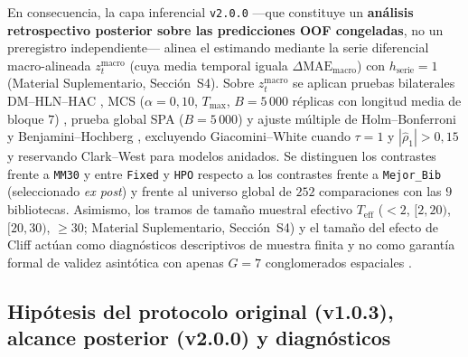 En consecuencia, la capa inferencial \texttt{v2.0.0} ---que constituye un \textbf{análisis retrospectivo posterior sobre las predicciones OOF congeladas}, no un preregistro independiente--- alinea el estimando mediante la serie diferencial macro-alineada $z_t^{\mathrm{macro}}$ (cuya media temporal iguala $\Delta\mathrm{MAE}_{\mathrm{macro}}$) con $h_{\mathrm{serie}}=1$ (Material Suplementario, Sección~S4). Sobre $z_t^{\mathrm{macro}}$ se aplican pruebas bilaterales DM--HLN--HAC \cite{diebold1995,harvey1997,newey1987}, MCS ($\alpha = 0{,}10$, $T_{\max}$, $B=5\,000$ réplicas con longitud media de bloque $7$) \cite{hansen2011mcs,politis1994stationary}, prueba global SPA ($B=5\,000$) \cite{hansen2005spa} y ajuste múltiple de Holm--Bonferroni \cite{holm1979} y Benjamini--Hochberg \cite{benjamini1995fdr}, excluyendo Giacomini--White \cite{giacomini2006tests} cuando $\tau=1$ y $|\hat{\rho}_1| > 0{,}15$ y reservando Clark--West \cite{clark2007nested} para modelos anidados. Se distinguen los contrastes frente a \texttt{MM30} y entre \texttt{Fixed} y \texttt{HPO} respecto a los contrastes frente a \texttt{Mejor\_Bib} (seleccionado \textit{ex post}) y frente al universo global de $252$ comparaciones con las $9$ bibliotecas. Asimismo, los tramos de tamaño muestral efectivo $T_{\mathrm{eff}}$ ($<2$, $[2,20)$, $[20,30)$, $\ge 30$; Material Suplementario, Sección~S4) y el tamaño del efecto de Cliff \cite{cliff1993dominance} actúan como diagnósticos descriptivos de muestra finita y no como garantía formal de validez asintótica con apenas $G=7$ conglomerados espaciales \cite{cameron2015cluster}.

\subsection{Hipótesis del protocolo original (v1.0.3), alcance posterior (v2.0.0) y diagnósticos}

